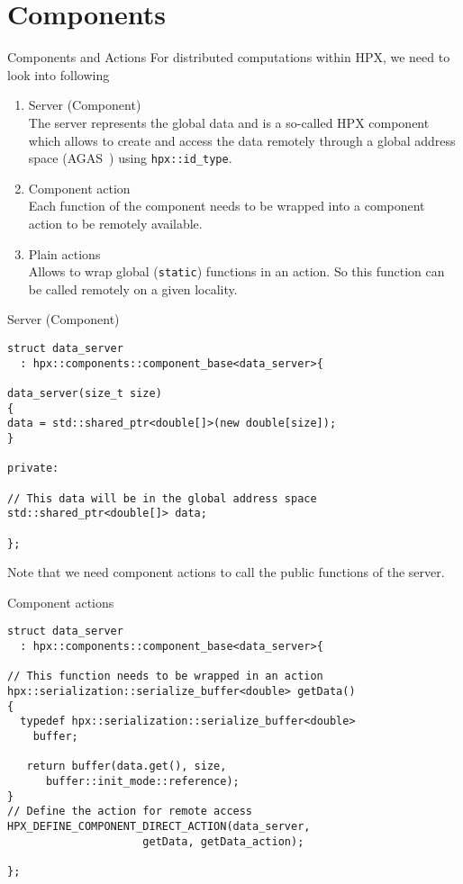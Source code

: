 \documentclass[\classoption]{beamer}
\begin{document}
\section{Components}

\begin{frame}{Components and Actions}
For distributed computations within HPX, we need to look into following 

\begin{enumerate}
\item Server (Component) \\
The server represents the global data and is a so-called HPX component which allows to create and access the data remotely through a global address space (AGAS~\cite{kaiser2014hpx}) using \lstinline|hpx::id_type|.
\item Component action \\
Each function of the component needs to be wrapped into a component action to be remotely available. 
\item Plain actions \\
Allows to wrap global (\lstinline|static|) functions in an action. So this function can be called remotely on a given locality.
\end{enumerate} 

\end{frame}


\begin{frame}[fragile]{Server (Component)}
\begin{lstlisting}
struct data_server
  : hpx::components::component_base<data_server>{

data_server(size_t size)
{
data = std::shared_ptr<double[]>(new double[size]);
}

private:

// This data will be in the global address space 
std::shared_ptr<double[]> data;

};
\end{lstlisting}
Note that we need component actions to call the public functions of the server.
\end{frame}


\begin{frame}[fragile]{Component actions}
\begin{lstlisting}
struct data_server
  : hpx::components::component_base<data_server>{

// This function needs to be wrapped in an action
hpx::serialization::serialize_buffer<double> getData()
{
  typedef hpx::serialization::serialize_buffer<double> 
    buffer;
  
   return buffer(data.get(), size,
      buffer::init_mode::reference);
}
// Define the action for remote access
HPX_DEFINE_COMPONENT_DIRECT_ACTION(data_server,
                     getData, getData_action);

};
\end{lstlisting}
\end{frame}
\end{document}
